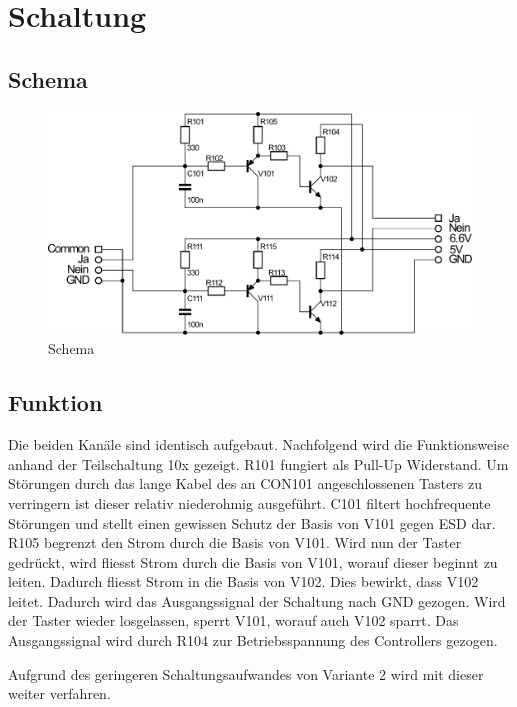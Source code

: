 
\section{Schaltung}

\subsection{Schema}
\begin{figure}[h!]
	\centering
	\includegraphics[scale=\schscale]{fig/xlr_pegelwandler_v_1_1_sch.pdf}
	\caption{Schema}
	\label{sch:pegw}
\end{figure}

\subsection{Funktion}
Die beiden Kanäle sind identisch aufgebaut. Nachfolgend wird die Funktionsweise anhand der Teilschaltung 10x gezeigt. R101 fungiert als Pull-Up Widerstand. Um Störungen durch das lange Kabel des an CON101 angeschlossenen Tasters zu verringern ist dieser relativ niederohmig ausgeführt. C101 filtert hochfrequente Störungen und stellt einen gewissen Schutz der Basis von V101 gegen ESD dar. R105 begrenzt den Strom durch die Basis von V101. Wird nun der Taster gedrückt, wird fliesst Strom durch die Basis von V101, worauf dieser beginnt zu leiten. Dadurch fliesst Strom in die Basis von V102. Dies bewirkt, dass V102 leitet. Dadurch wird das Ausgangssignal der Schaltung nach GND gezogen. Wird der Taster wieder losgelassen, sperrt V101, worauf auch V102 sparrt. Das Ausgangssignal wird durch R104 zur Betriebsspannung des Controllers gezogen. 

Aufgrund des geringeren Schaltungsaufwandes von Variante 2 wird mit dieser weiter verfahren. 

